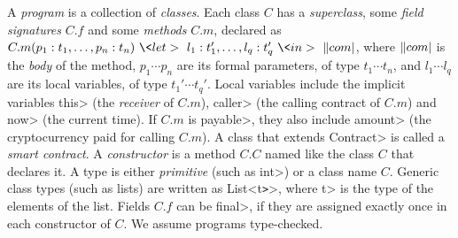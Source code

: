 \begin{definition}[Program]\label{def:program}
  A \emph{program} is a collection of \emph{classes}.
  Each class $C$ has a \emph{superclass}, some \emph{field signatures} $C.f$
  and some \emph{methods} $C.m$, declared as
  $C.m(p_1:t_1,\ldots,p_n:t_n)\ \<let>\ l_1:t_1',\ldots,l_q:t_q'\ \<in>\ \com$,
  where $\com$ is the \emph{body} of the method, $p_1\cdots p_n$ are its
  formal parameters, of type $t_1\cdots t_n$, and $l_1\cdots l_q$ are its
  local variables, of type $t_1'\cdots t_q'$. Local variables include the
  implicit variables \<this> (the \emph{receiver} of $C.m$),
  \<caller> (the calling contract of $C.m$) and \<now> (the current time).
  If $C.m$ is \<payable>, they also include \<amount>
  (the cryptocurrency paid for calling $C.m$).
  A class that extends \<Contract> is called a \emph{smart contract}.
  A \emph{constructor} is a method $C.C$ named like the class $C$ that declares it.
  A type is either \emph{primitive} (such as \<int>)
  or a class name $C$. Generic class types (such as lists) are written as
  \<List<t\texttt{>}>, where \<t> is the type of the elements of the list.
  Fields $C.f$ can be \<final>, if they are assigned exactly once in each
  constructor of $C$. We assume programs type-checked.
\end{definition}

